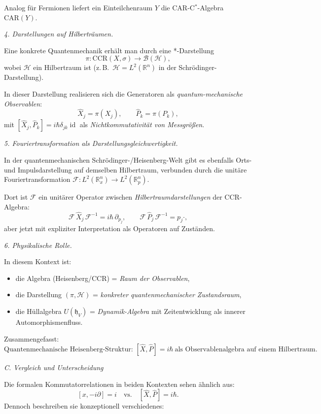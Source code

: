 \documentclass[10pt, letterpaper]{article}
\newcommand{\id}{\operatorname{id}}
\newcommand{\R}{\mathbb{R}}
\begin{document}
Analog für Fermionen liefert ein Einteilchenraum \(Y\) die CAR-C$^\ast$-Algebra
\(\mathrm{CAR}(Y)\).

\emph{4. Darstellungen auf Hilberträumen.}

Eine konkrete Quantenmechanik erhält man durch eine *-Darstellung
\[
\pi:\mathrm{CCR}(X,\sigma)\to\mathcal{B}(\mathcal{H}),
\]
wobei \(\mathcal{H}\) ein Hilbertraum ist
(z.\,B.\ \(\mathcal{H}=L^2(\R^n)\) in der Schrödinger-Darstellung).

In dieser Darstellung realisieren sich die Generatoren als
\emph{quantum-mechanische Observablen}:
\[
\hat{X}_j = \pi(X_j),\qquad \hat{P}_k = \pi(P_k),
\]
mit \([\hat{X}_j,\hat{P}_k]=i\hbar\delta_{jk}\id\) als \emph{Nichtkommutativität von Messgrößen}.

\emph{5. Fouriertransformation als Darstellungsgleichwertigkeit.}

In der quantenmechanischen Schrödinger-/Heisenberg-Welt
gibt es ebenfalls Orts- und Impulsdarstellung auf demselben Hilbertraum,
verbunden durch die unitäre Fouriertransformation
\(\mathcal{F}:L^2(\R^n_x)\to L^2(\R^n_p)\).

Dort ist \(\mathcal{F}\) ein unitärer Operator zwischen
\emph{Hilbertraumdarstellungen} der CCR-Algebra:
\[
\mathcal{F}\,\hat{X}_j\,\mathcal{F}^{-1} = i\hbar\,\partial_{p_j},\qquad
\mathcal{F}\,\hat{P}_j\,\mathcal{F}^{-1} = p_j\cdot,
\]
aber jetzt mit expliziter Interpretation als Operatoren auf Zuständen.

\emph{6. Physikalische Rolle.}

In diesem Kontext ist:
\begin{itemize}
  \item die Algebra (Heisenberg/CCR) = \emph{Raum der Observablen},
  \item die Darstellung \((\pi,\mathcal{H})\) = \emph{konkreter quantenmechanischer Zustandsraum},
  \item die Hüllalgebra \(U(\mathfrak{h}_V)\) = \emph{Dynamik-Algebra}
        mit Zeitentwicklung als innerer Automorphismenfluss.
\end{itemize}

Zusammengefasst:
\[
\boxed{
\text{Quantenmechanische Heisenberg-Struktur: } [\hat X,\hat P]=i\hbar\ \text{als Observablenalgebra auf einem Hilbertraum.}
}
\]

\emph{C. Vergleich und Unterscheidung}

Die formalen Kommutatorrelationen in beiden Kontexten sehen ähnlich aus:
\[
[x,-i\partial] = i \quad\text{vs.}\quad [\hat X,\hat P]=i\hbar.
\]
Dennoch beschreiben sie konzeptionell verschiedenes:
\end{document}
